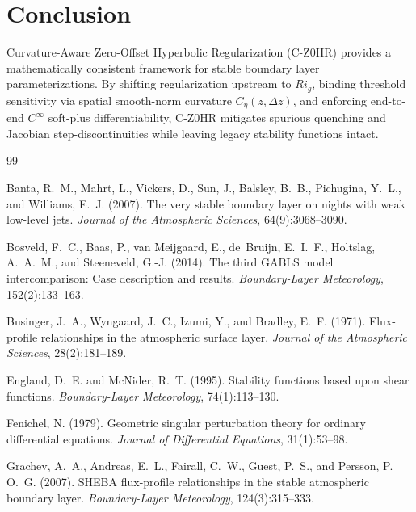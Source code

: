 \documentclass[11pt,a4paper]{article}
\begin{document}
\section{Conclusion}
Curvature-Aware Zero-Offset Hyperbolic Regularization (C-Z0HR) provides a mathematically consistent framework for stable boundary layer parameterizations. By shifting regularization upstream to $Ri_g$, binding threshold sensitivity via spatial smooth-norm curvature $C_\eta(z, \Delta z)$, and enforcing end-to-end $C^\infty$ soft-plus differentiability, C-Z0HR mitigates spurious quenching and Jacobian step-discontinuities while leaving legacy stability functions intact.

\begin{thebibliography}{99}

Banta, R.~M., Mahrt, L., Vickers, D., Sun, J., Balsley, B.~B., Pichugina, Y.~L., and Williams, E.~J. (2007).
\newblock The very stable boundary layer on nights with weak low-level jets.
\newblock \emph{Journal of the Atmospheric Sciences}, 64(9):3068--3090.

Bosveld, F.~C., Baas, P., van Meijgaard, E., de~Bruijn, E.~I.~F., Holtslag, A.~A.~M., and Steeneveld, G.-J. (2014).
\newblock The third GABLS model intercomparison: Case description and results.
\newblock \emph{Boundary-Layer Meteorology}, 152(2):133--163.

Businger, J.~A., Wyngaard, J.~C., Izumi, Y., and Bradley, E.~F. (1971).
\newblock Flux-profile relationships in the atmospheric surface layer.
\newblock \emph{Journal of the Atmospheric Sciences}, 28(2):181--189.

England, D.~E. and McNider, R.~T. (1995).
\newblock Stability functions based upon shear functions.
\newblock \emph{Boundary-Layer Meteorology}, 74(1):113--130.

Fenichel, N. (1979).
\newblock Geometric singular perturbation theory for ordinary differential equations.
\newblock \emph{Journal of Differential Equations}, 31(1):53--98.

Grachev, A.~A., Andreas, E.~L., Fairall, C.~W., Guest, P.~S., and Persson, P. O.~G. (2007).
\newblock SHEBA flux-profile relationships in the stable atmospheric boundary layer.
\newblock \emph{Boundary-Layer Meteorology}, 124(3):315--333.


\end{thebibliography}
\end{document}
